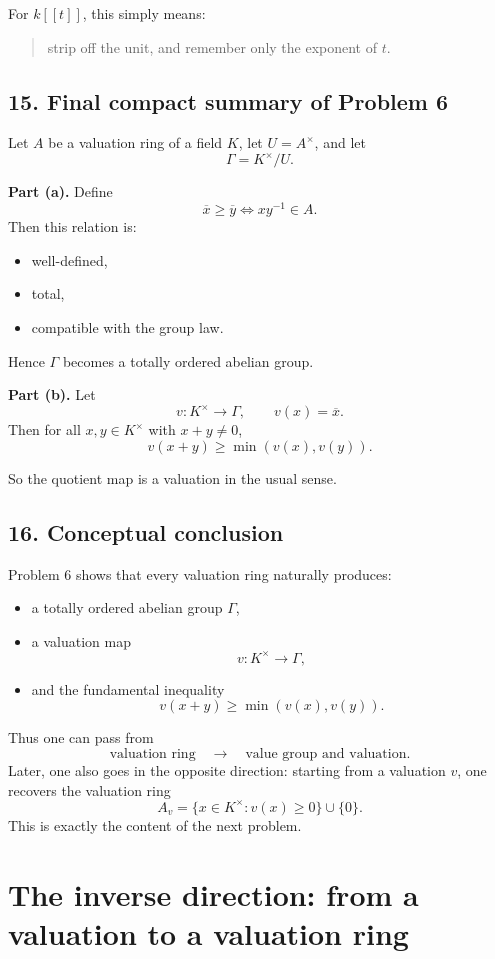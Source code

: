 \documentclass[12pt,a4paper]{article}
\theoremstyle{notespace}
\begin{document}
For \(k[[t]]\), this simply means:
\begin{quote}
	strip off the unit, and remember only the exponent of \(t\).
\end{quote}

\subsection{15. Final compact summary of Problem 6}

Let \(A\) be a valuation ring of a field \(K\), let \(U=A^\times\), and let
\[
\Gamma=K^\times/U.
\]

\textbf{Part (a).}
Define
\[
\overline x \ge \overline y
\iff
xy^{-1}\in A.
\]
Then this relation is:
\begin{itemize}
	\item well-defined,
	\item total,
	\item compatible with the group law.
\end{itemize}
Hence \(\Gamma\) becomes a totally ordered abelian group.

\textbf{Part (b).}
Let
\[
v:K^\times\to \Gamma,
\qquad
v(x)=\overline x.
\]
Then for all \(x,y\in K^\times\) with \(x+y\neq 0\),
\[
v(x+y)\ge \min(v(x),v(y)).
\]

So the quotient map is a valuation in the usual sense.

\subsection{16. Conceptual conclusion}

Problem 6 shows that every valuation ring naturally produces:
\begin{itemize}
	\item a totally ordered abelian group \(\Gamma\),
	\item a valuation map
	\[
	v:K^\times\to \Gamma,
	\]
	\item and the fundamental inequality
	\[
	v(x+y)\ge \min(v(x),v(y)).
	\]
\end{itemize}

Thus one can pass from
\[
\text{valuation ring}
\quad \longrightarrow \quad
\text{value group and valuation}.
\]
Later, one also goes in the opposite direction: starting from a valuation \(v\), one recovers the valuation ring
\[
A_v=\{x\in K^\times : v(x)\ge 0\}\cup\{0\}.
\]
This is exactly the content of the next problem.

\section{The inverse direction: from a valuation to a valuation ring}
\end{document}
